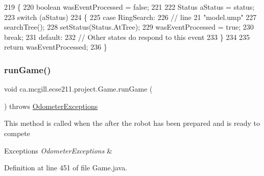 \begin{DoxyCode}
219   \{
220     \textcolor{keywordtype}{boolean} wasEventProcessed = \textcolor{keyword}{false};
221     
222     Status aStatus = status;
223     \textcolor{keywordflow}{switch} (aStatus)
224     \{
225       \textcolor{keywordflow}{case} RingSearch:
226         \textcolor{comment}{// line 21 "model.ump"}
227         searchTree();
228         setStatus(Status.AtTree);
229         wasEventProcessed = \textcolor{keyword}{true};
230         \textcolor{keywordflow}{break};
231       \textcolor{keywordflow}{default}:
232         \textcolor{comment}{// Other states do respond to this event}
233     \}
234 
235     \textcolor{keywordflow}{return} wasEventProcessed;
236   \}
\end{DoxyCode}
\mbox{\label{enumca_1_1mcgill_1_1ecse211_1_1project_1_1_game_adf69abe44e952d627fb9e6a2f678cb5e}} 
\subsubsection{\texorpdfstring{run\+Game()}{runGame()}}
{\footnotesize\ttfamily void ca.\+mcgill.\+ecse211.\+project.\+Game.\+run\+Game (\begin{DoxyParamCaption}{ }\end{DoxyParamCaption}) throws \hyperlink{classca_1_1mcgill_1_1ecse211_1_1odometer_1_1_odometer_exceptions}{Odometer\+Exceptions}}

This method is called when the after the robot has been prepared and is ready to compete


\begin{DoxyExceptions}{Exceptions}
{\em Odometer\+Exceptions} & \\
\hline
\end{DoxyExceptions}


Definition at line 451 of file Game.\+java.


